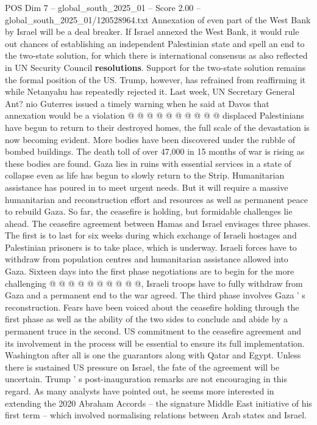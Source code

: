 \begin{textsample}{POS Dim 7 – global\_south\_2025\_01 – Score 2.00 – global\_south\_2025\_01/120528964.txt}
Annexation of even part of the West Bank by Israel will be a deal breaker.
If Israel annexed the West Bank, it would rule out chances of establishing an independent Palestinian state and spell an end to the two-state solution, for which there is international consensus as also reflected in UN Security Council \textbf{resolutions}.
Support for the two-state solution remains the formal position of the US.
Trump, however, has refrained from reaffirming it while Netanyahu has repeatedly rejected it.
Last week, UN Secretary General Ant? nio Guterres issued a timely warning when he said at Davos that annexation would be a violation @ @ @ @ @ @ @ @ @ @ displaced Palestinians have begun to return to their destroyed homes, the full scale of the devastation is now becoming evident.
More bodies have been discovered under the rubble of bombed buildings.
The death toll of over 47,000 in 15 months of war is rising as these bodies are found.
Gaza lies in ruins with essential services in a state of collapse even as life has begun to slowly return to the Strip.
Humanitarian assistance has poured in to meet urgent needs.
But it will require a massive humanitarian and reconstruction effort and resources as well as permanent peace to rebuild Gaza.
So far, the ceasefire is holding, but formidable challenges lie ahead.
The ceasefire agreement between Hamas and Israel envisages three phases.
The first is to last for six weeks during which exchange of Israeli hostages and Palestinian prisoners is to take place, which is underway.
Israeli forces have to withdraw from population centres and humanitarian assistance allowed into Gaza.
Sixteen days into the first phase negotiations are to begin for the more challenging @ @ @ @ @ @ @ @ @ @, Israeli troops have to fully withdraw from Gaza and a permanent end to the war agreed.
The third phase involves Gaza ' s reconstruction.
Fears have been voiced about the ceasefire holding through the first phase as well as the ability of the two sides to conclude and abide by a permanent truce in the second.
US commitment to the ceasefire agreement and its involvement in the process will be essential to ensure its full implementation.
Washington after all is one the guarantors along with Qatar and Egypt.
Unless there is sustained US pressure on Israel, the fate of the agreement will be uncertain.
Trump ' s post-inauguration remarks are not encouraging in this regard.
As many analysts have pointed out, he seems more interested in extending the 2020 Abraham Accords -- the signature Middle East initiative of his first term -- which involved normalising relations between Arab states and Israel.

\end{textsample}

